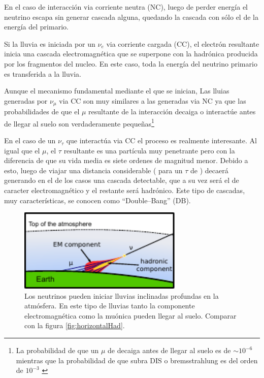 En el caso de interacción via corriente neutra (NC), luego de perder energía el neutrino escapa sin generar cascada alguna, quedando la cascada con sólo el  de la energía del primario.

Si la lluvia es iniciada por un $\nu_e$ via corriente cargada (CC), el electrón resultante inicia una cascada electromagnética que se superpone con la hadrónica producida por los fragmentos del nucleo.
En este caso, toda la energía del neutrino primario es transferida a la lluvia.

Aunque el mecanismo fundamental mediante el que se inician, Las lluias generadas por $\nu_{\mu}$ via CC son muy similares a las generadas via NC ya que las probabilidades de que el $\mu$ resultante de la interacción decaiga o interactúe antes de llegar al suelo son verdaderamente pequeñas\footnote{La probabilidad de que un $\mu$ de  decaiga antes de llegar al suelo es de $\sim10^{-6}$ mientras que la probabilidad de que subra DIS o bremsstrahlung es del orden de $10^{-3}$ \cite{cite:tesisJavier}} 

En el caso de un $\nu_{\tau}$ que interactúa via CC el proceso es realmente interesante.
Al igual que el $\mu$, el $\tau$ resultante es una partícula muy penetrante pero con la diferencia de que su vida media es siete ordenes de magnitud menor.
Debido a esto, luego de viajar una distancia considerable ( para un $\tau$ de ) decaerá generando en el  de los casos una cascada detectable, que a su vez será el  de caracter electromagnético y el  restante será hadrónico.
Este tipo de cascadas, muy características, se conocen como ``Double--Bang'' (DB).
%
\begin{figure}[h!]
\begin{center}
\includegraphics[width=0.7\textwidth]{fig/EASAuger/horizontal_deep_english.pdf}
\caption{Los neutrinos pueden iniciar lluvias inclinadas profundas en la atmósfera.
En este tipo de lluvias tanto la componente electromagnética como la muónica pueden llegar al suelo.
Comparar con la figura \ref{fig:horizontalHad}.
}
\label{fig:horizontalNu}
\end{center}
\end{figure}

